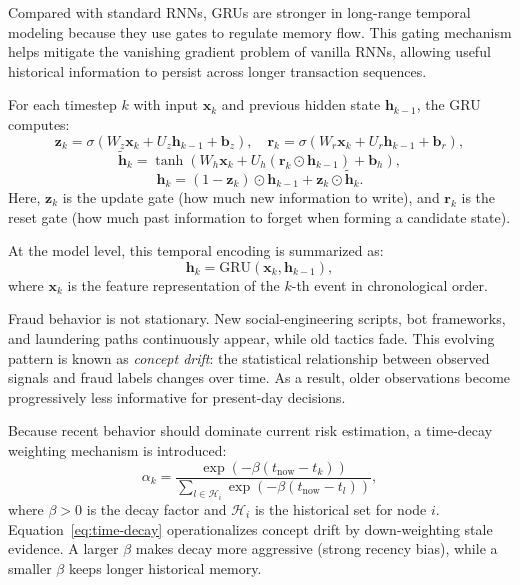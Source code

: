 \documentclass[12pt,a4paper]{report}
\begin{document}
Compared with standard RNNs, GRUs are stronger in long-range temporal modeling because they use gates to regulate memory flow. This gating mechanism helps mitigate the vanishing gradient problem of vanilla RNNs, allowing useful historical information to persist across longer transaction sequences.

For each timestep $k$ with input $\mathbf{x}_k$ and previous hidden state $\mathbf{h}_{k-1}$, the GRU computes:
\begin{equation}
\mathbf{z}_k = \sigma\!\left(W_z\mathbf{x}_k + U_z\mathbf{h}_{k-1} + \mathbf{b}_z\right), \quad
\mathbf{r}_k = \sigma\!\left(W_r\mathbf{x}_k + U_r\mathbf{h}_{k-1} + \mathbf{b}_r\right),
\end{equation}
\begin{equation}
\tilde{\mathbf{h}}_k = \tanh\!\left(W_h\mathbf{x}_k + U_h(\mathbf{r}_k \odot \mathbf{h}_{k-1}) + \mathbf{b}_h\right),
\end{equation}
\begin{equation}
\mathbf{h}_k = (1-\mathbf{z}_k)\odot \mathbf{h}_{k-1} + \mathbf{z}_k \odot \tilde{\mathbf{h}}_k.
\end{equation}
Here, $\mathbf{z}_k$ is the update gate (how much new information to write), and $\mathbf{r}_k$ is the reset gate (how much past information to forget when forming a candidate state).

At the model level, this temporal encoding is summarized as:
\begin{equation}
\mathbf{h}_k = \mathrm{GRU}(\mathbf{x}_k,\mathbf{h}_{k-1}),
\label{eq:gru-temporal}
\end{equation}
where $\mathbf{x}_k$ is the feature representation of the $k$-th event in chronological order.

Fraud behavior is not stationary. New social-engineering scripts, bot frameworks, and laundering paths continuously appear, while old tactics fade. This evolving pattern is known as \emph{concept drift}: the statistical relationship between observed signals and fraud labels changes over time. As a result, older observations become progressively less informative for present-day decisions.

Because recent behavior should dominate current risk estimation, a time-decay weighting mechanism is introduced:
\begin{equation}
\alpha_k =
\frac{\exp\left(-\beta (t_{\mathrm{now}}-t_k)\right)}
{\sum_{l \in \mathcal{H}_i}\exp\left(-\beta (t_{\mathrm{now}}-t_l)\right)},
\label{eq:time-decay}
\end{equation}
where $\beta>0$ is the decay factor and $\mathcal{H}_i$ is the historical set for node $i$. Equation~\eqref{eq:time-decay} operationalizes concept drift by down-weighting stale evidence. A larger $\beta$ makes decay more aggressive (strong recency bias), while a smaller $\beta$ keeps longer historical memory.
\end{document}
